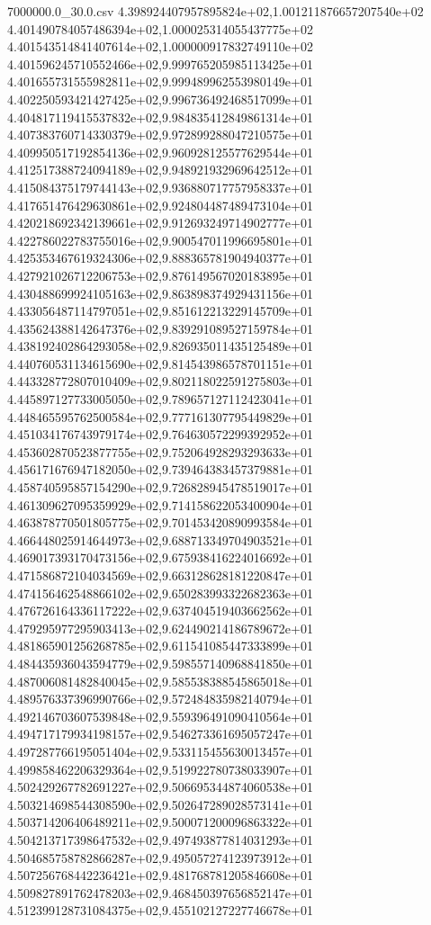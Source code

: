 \begin{filecontents*}{7000000.0_30.0.csv}
4.398924407957895824e+02,1.001211876657207540e+02
4.401490784057486394e+02,1.000025314055437775e+02
4.401543514841407614e+02,1.000000917832749110e+02
4.401596245710552466e+02,9.999765205985113425e+01
4.401655731555982811e+02,9.999489962553980149e+01
4.402250593421427425e+02,9.996736492468517099e+01
4.404817119415537832e+02,9.984835412849861314e+01
4.407383760714330379e+02,9.972899288047210575e+01
4.409950517192854136e+02,9.960928125577629544e+01
4.412517388724094189e+02,9.948921932969642512e+01
4.415084375179744143e+02,9.936880717757958337e+01
4.417651476429630861e+02,9.924804487489473104e+01
4.420218692342139661e+02,9.912693249714902777e+01
4.422786022783755016e+02,9.900547011996695801e+01
4.425353467619324306e+02,9.888365781904940377e+01
4.427921026712206753e+02,9.876149567020183895e+01
4.430488699924105163e+02,9.863898374929431156e+01
4.433056487114797051e+02,9.851612213229145709e+01
4.435624388142647376e+02,9.839291089527159784e+01
4.438192402864293058e+02,9.826935011435125489e+01
4.440760531134615690e+02,9.814543986578701151e+01
4.443328772807010409e+02,9.802118022591275803e+01
4.445897127733005050e+02,9.789657127112423041e+01
4.448465595762500584e+02,9.777161307795449829e+01
4.451034176743979174e+02,9.764630572299392952e+01
4.453602870523877755e+02,9.752064928293293633e+01
4.456171676947182050e+02,9.739464383457379881e+01
4.458740595857154290e+02,9.726828945478519017e+01
4.461309627095359929e+02,9.714158622053400904e+01
4.463878770501805775e+02,9.701453420890993584e+01
4.466448025914644973e+02,9.688713349704903521e+01
4.469017393170473156e+02,9.675938416224016692e+01
4.471586872104034569e+02,9.663128628181220847e+01
4.474156462548866102e+02,9.650283993322682363e+01
4.476726164336117222e+02,9.637404519403662562e+01
4.479295977295903413e+02,9.624490214186789672e+01
4.481865901256268785e+02,9.611541085447333899e+01
4.484435936043594779e+02,9.598557140968841850e+01
4.487006081482840045e+02,9.585538388545865018e+01
4.489576337396990766e+02,9.572484835982140794e+01
4.492146703607539848e+02,9.559396491090410564e+01
4.494717179934198157e+02,9.546273361695057247e+01
4.497287766195051404e+02,9.533115455630013457e+01
4.499858462206329364e+02,9.519922780738033907e+01
4.502429267782691227e+02,9.506695344874060538e+01
4.503214698544308590e+02,9.502647289028573141e+01
4.503714206406489211e+02,9.500071200096863322e+01
4.504213717398647532e+02,9.497493877814031293e+01
4.504685758782866287e+02,9.495057274123973912e+01
4.507256768442236421e+02,9.481768781205846608e+01
4.509827891762478203e+02,9.468450397656852147e+01
4.512399128731084375e+02,9.455102127227746678e+01

\end{filecontents*}
